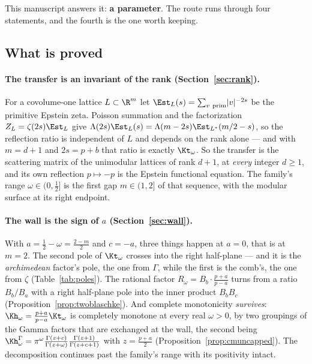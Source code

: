 This manuscript answers it: \textbf{a parameter}. The route runs through four
statements, and the fourth is the one worth keeping.

\subsection{What is proved}\label{sec:intro-results}

\paragraph{The transfer is an invariant of the rank
(Section~\ref{sec:rank}).} For a covolume-one lattice $L\subset\R^{m}$ let
$\Est_L(s)=\sum_{v\ \mathrm{prim}}\lvert v\rvert^{-2s}$ be the primitive Epstein
zeta. Poisson summation and the factorization $Z_L=\zeta(2s)\Est_L$ give
$\Lambda(2s)\Est_L(s)=\Lambda(m-2s)\Est_{L^{*}}(m/2-s)$, so the reflection ratio
is independent of $L$ and depends on the rank alone --- and with $m=d+1$ and
$2s=p+b$ that ratio is exactly $\Kt_\omega$. So the transfer is the scattering
matrix of the unimodular lattices of rank $d+1$, at \emph{every} integer $d\ge1$,
and its own reflection $p\mapsto-p$ is the Epstein functional equation. The
family's range $\omega\in(0,\frac12]$ is the first gap $m\in(1,2]$ of that
sequence, with the modular surface at its right endpoint.

\paragraph{The wall is the sign of $a$ (Section~\ref{sec:wall}).} With
$a=\frac12-\omega=\frac{2-m}2$ and $c=-a$, three things happen at $a=0$, that is
at $m=2$. The second pole of $\Kt_\omega$ crosses into the right half-plane ---
and it is the \emph{archimedean} factor's pole, the one from $\Gamma$, while the
first is the comb's, the one from $\zeta$ (Table~\ref{tab:poles}). The rational
factor $R_\omega=B_b\cdot\frac{p+a}{p-a}$ turns from a ratio $B_b/B_a$ with a
right half-plane pole into the inner product $B_bB_c$
(Proposition~\ref{prop:twoblaschke}). And complete monotonicity \emph{survives}:
$\Kh_\omega=\frac{p+a}{p-a}\Kt_\omega$ is completely monotone at every real
$\omega>0$, by two groupings of the Gamma factors that are exchanged at the wall,
the second being
$\Kh^\Gamma_\omega=\pi^\omega\frac{\Gamma(z+c)}{\Gamma(z+\omega)}\frac{\Gamma(z+1)}{\Gamma(z+c+1)}$
with $z=\frac{p+a}2$ (Proposition~\ref{prop:cmuncapped}). The decomposition
continues past the family's range with its positivity intact.

